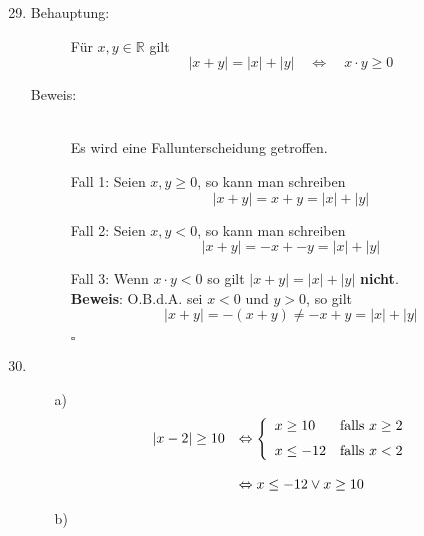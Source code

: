 \documentclass[12pt,a4paper,leqno]{article}
\begin{document}
\begin{enumerate}
\setcounter{enumi}{28}

\item %
\begin{description}
\item[Behauptung:] Für $x,y\in \mathbb{R}$ gilt 
	\begin{equation*}
	|x+y|= |x|+|y| \quad \Leftrightarrow \quad x\cdot y \ge 0
	\end{equation*}		
\item[Beweis:] \hfill \\
	Es wird eine Fallunterscheidung getroffen.
	
	Fall 1: Seien $x, y \geq 0$, so kann man schreiben
	\begin{displaymath}
		|x + y| = x + y = |x| + |y|
	\end{displaymath}
	
	
	Fall 2: Seien $x, y < 0$, so kann man schreiben
	\begin{displaymath}
		|x + y| = -x + -y = |x| + |y|
	\end{displaymath}
	
	Fall 3: Wenn $x\cdot y<0$ so gilt $|x+y| = |x|+|y|$ \textbf{nicht}. \\
	\textbf{Beweis}: O.B.d.A. sei $x < 0$ und $y > 0$, so gilt
	\begin{displaymath}
		|x+y| = - (x+y) \neq -x + y = |x| + |y| 
	\end{displaymath}
	
	\begin{flushright}$\square$\end{flushright}
	
	

\end{description}
\item %



\begin{enumerate}
\item[a)] 
	\begin{displaymath}
	\begin{array}{l l}
	|x-2| \geq 10 &\Leftrightarrow \left\{
	\begin{array}{l l}
		x \geq 10 & \textrm{falls } x \geq 2 \\[6pt]
		x \leq -12 & \textrm{falls } x < 2 \\
	\end{array}\right.  \\ 
	\hfill \\
	& \Leftrightarrow x \leq -12 \vee x \geq 10 
	\end{array}
	\end{displaymath}
\item[b)] 


\end{enumerate}
\end{enumerate}
\end{document}
